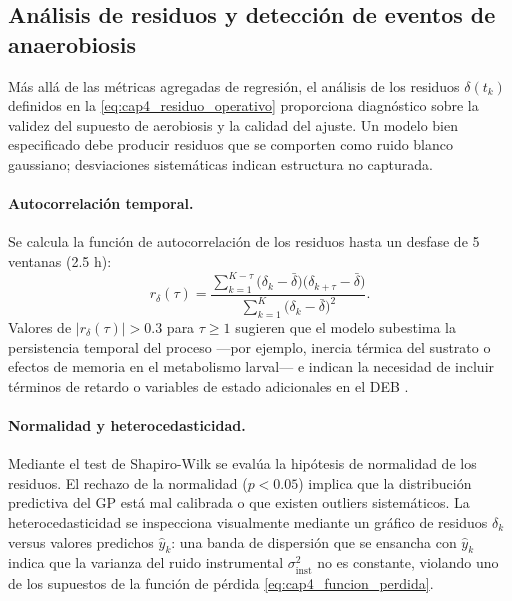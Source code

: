 \subsection{Análisis de residuos y detección de eventos de anaerobiosis}
\label{subsec:cap4_residuos_anaerobiosis}

Más allá de las métricas agregadas de regresión, el análisis de los residuos $\delta(t_k)$ definidos en la \cref{eq:cap4_residuo_operativo} proporciona diagnóstico sobre la validez del supuesto de aerobiosis y la calidad del ajuste. Un modelo bien especificado debe producir residuos que se comporten como ruido blanco gaussiano; desviaciones sistemáticas indican estructura no capturada.

\paragraph{Autocorrelación temporal.}
Se calcula la función de autocorrelación de los residuos hasta un desfase de \num{5} ventanas (\num{2.5} h):
\begin{equation}
    \label{eq:cap4_autocorrelacion}
    r_{\delta}(\tau) = \frac{\sum_{k=1}^{K-\tau}\bigl(\delta_k - \bar{\delta}\bigr)
    \bigl(\delta_{k+\tau} - \bar{\delta}\bigr)}
    {\sum_{k=1}^{K}\bigl(\delta_k - \bar{\delta}\bigr)^{2}}.
\end{equation}
Valores de $|r_{\delta}(\tau)| > \num{0.3}$ para $\tau \geq 1$ sugieren que el modelo subestima la persistencia temporal del proceso —por ejemplo, inercia térmica del sustrato o efectos de memoria en el metabolismo larval— e indican la necesidad de incluir términos de retardo o variables de estado adicionales en el DEB \parencite{eriksenDynamicModellingFeed2022}.

\paragraph{Normalidad y heterocedasticidad.}
Mediante el test de Shapiro-Wilk se evalúa la hipótesis de normalidad de los residuos. El rechazo de la normalidad ($p < \num{0.05}$) implica que la distribución predictiva del GP está mal calibrada o que existen outliers sistemáticos. La heterocedasticidad se inspecciona visualmente mediante un gráfico de residuos $\delta_k$ versus valores predichos $\hat{y}_k$: una banda de dispersión que se ensancha con $\hat{y}_k$ indica que la varianza del ruido instrumental $\sigma^{2}_{\mathrm{inst}}$ no es constante, violando uno de los supuestos de la función de pérdida \eqref{eq:cap4_funcion_perdida}.

